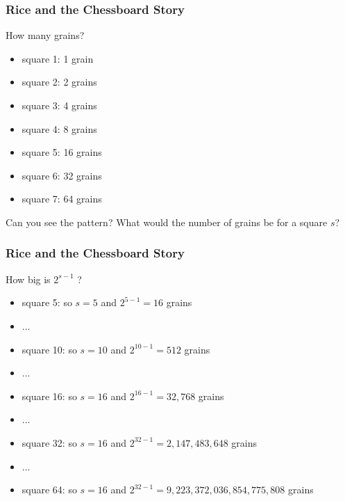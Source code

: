 \documentclass[notheorems
          ]
          {beamer}
\begin{document}
\begin{frame}
 \frametitle {  Rice and the Chessboard Story    }
 How many grains? 
 
 \begin{itemize} [<*>] 
  \item square 1: 1 grain
  \item square 2: 2 grains 
  \item square 3: 4 grains 
  \item square 4: 8 grains 
  \item square 5: 16 grains 
  \item square 6: 32 grains 
  \item square 7: 64 grains 
 \end{itemize}
 
 Can you see the pattern? What would the number of grains be for a square $s$?
 

\end{frame}


\begin{frame}
 \frametitle {  Rice and the Chessboard Story    }
 How big is $2^{s-1}$ ? 
 
 \begin{itemize} [<*>] 
  \item square 5: so $s=5$ and  $2^{5-1} = 16$ grains   
  \item ... 
  \item square 10: so $s=10$ and  $2^{10-1} = 512$ grains   
  \item ... 
  \item square 16: so $s=16$ and  $2^{16-1} = 32,768 $ grains  
  \item ... 
  \item square 32: so $s=16$ and  $2^{32-1} = 2,147,483,648 $ grains   
  \item ... 
  \item square 64: so $s=16$ and  $2^{32-1} = 9,223,372,036,854,775,808 $ grains   
 \end{itemize}
 

 
 

\end{frame}
\end{document}
